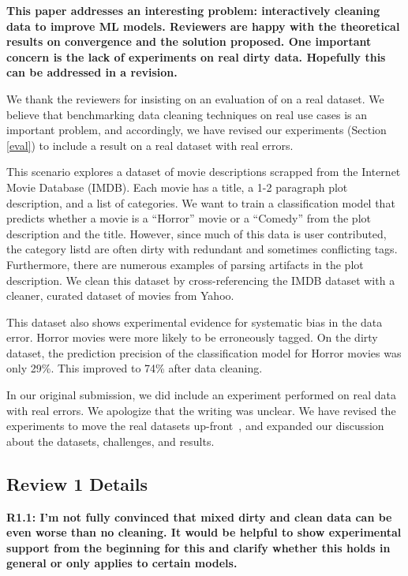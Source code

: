 \noindent\noindent \textbf{This paper addresses an interesting problem: interactively cleaning data to improve ML models. Reviewers are happy with the theoretical results on convergence and the solution proposed. One important concern is the lack of experiments on real dirty data. Hopefully this can be addressed in a revision.}

\vspace{0.5em}

We thank the reviewers for insisting on an evaluation of \sys on a real dataset. We believe that benchmarking data cleaning techniques on real use cases is an important problem, and accordingly, we have revised our experiments (Section \ref{eval}) to include a result on a real dataset with real errors. 

This scenario explores a dataset of movie descriptions scrapped from the Internet Movie Database (IMDB). 
Each movie has a title, a 1-2 paragraph plot description, and a list of categories.
We want to train a classification model that predicts whether a movie is a ``Horror'' movie or a ``Comedy'' from the plot description and the title.
However, since much of this data is user contributed, the category listd are often dirty with redundant and sometimes conflicting tags.
Furthermore, there are numerous examples of parsing artifacts in the plot description.
We clean this dataset by cross-referencing the IMDB dataset with a cleaner, curated dataset of movies from Yahoo.

This dataset also shows experimental evidence for systematic bias in the data error.
Horror movies were more likely to be erroneously tagged. 
On the dirty dataset, the prediction precision of the classification model for Horror movies was only 29\%.
This improved to 74\% after data cleaning.

In our original submission, we did include an experiment performed on real data with real errors. 
We apologize that the writing was unclear. We have revised the experiments to move the real datasets up-front~\cite{real-errors}, and expanded our discussion about the datasets, challenges, and results.

\subsection*{Review 1 Details} 

\noindent\textbf{R1.1: I'm not fully convinced that mixed dirty and clean data can be even worse than no cleaning. It would be helpful to show experimental support from the beginning for this and clarify whether this holds in general or only applies to certain models.}

